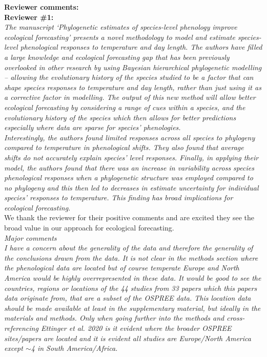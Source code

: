 \documentclass[11pt]{article}
\begin{document}
{\bf Reviewer comments:} \\

{\bf Reviewer \#1:}\\


\emph{The manuscript ‘Phylogenetic estimates of species-level phenology improve ecological forecasting’ presents a novel methodology to model and estimate species-level phenological responses to temperature and day length. The authors have filled a large knowledge and ecological forecasting gap that has been previously overlooked in other research by using Bayesian hierarchical phylogenetic modelling – allowing the evolutionary history of the species studied to be a factor that can shape species responses to temperature and day length, rather than just using it as a corrective factor in modelling. The output of this new method will allow better ecological forecasting by considering a range of cues within a species, and the evolutionary history of the species which then allows for better predictions especially where data are sparse for species’ phenologies.}\\

\emph{Interestingly, the authors found limited responses across all species to phylogeny compared to temperature in phenological shifts. They also found that average shifts do not accurately explain species’ level responses. Finally, in applying their model, the authors found that there was an increase in variability across species phenological responses when a phylogenetic structure was employed compared to no phylogeny and this then led to decreases in estimate uncertainty for individual species' responses to temperature. This finding has broad implications for ecological forecasting.}\\

We thank the reviewer for their positive comments and are excited they see the broad value in our approach for ecological forecasting.\\

\emph{Major comments}\\
\emph{I have a concern about the generality of the data and therefore the generality of the conclusions drawn from the data. It is not clear in the methods section where the phenological data are located but of course temperate Europe and North America would be highly overrepresented in these data. It would be good to see the countries, regions or locations of the 44 studies from 33 papers which this papers data originate from, that are a subset of the OSPREE data. This location data should be made available at least in the supplementary material, but ideally in the materials and methods. Only when going further into the methods and cross-referencing Ettinger et al. 2020 is it evident where the broader OSPREE sites/papers are located and it is evident all studies are Europe/North America except $\sim$4 in South America/Africa.}\\
\end{document}
